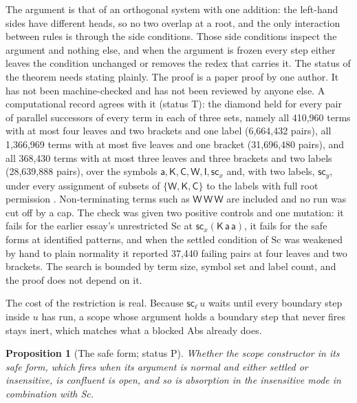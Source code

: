 \documentclass[11pt]{article}
\newtheorem{proposition}[theorem]{Proposition}
\theoremstyle{definition}
\theoremstyle{remark}
\newcommand{\cI}{\mathsf{I}}
\newcommand{\cC}{\mathsf{C}}
\newcommand{\cK}{\mathsf{K}}
\newcommand{\cW}{\mathsf{W}}
\newcommand{\sca}[1]{\mathsf{sc}_{#1}}
\newcommand{\Tt}{status T}
\newcommand{\Pt}{status P}
\begin{document}
The argument is that of an orthogonal system with one addition: the left-hand sides have different heads, so no two overlap at a root, and the only interaction between rules is through the side conditions. Those side conditions inspect the argument and nothing else, and when the argument is frozen every step either leaves the condition unchanged or removes the redex that carries it. The status of the theorem needs stating plainly. The proof is a paper proof by one author. It has not been machine-checked and has not been reviewed by anyone else. A computational record agrees with it (\Tt): the diamond held for every pair of parallel successors of every term in each of three sets, namely all 410{,}960 terms with at most four leaves and two brackets and one label (6{,}664{,}432 pairs), all 1{,}366{,}969 terms with at most five leaves and one bracket (31{,}696{,}480 pairs), and all 368{,}430 terms with at most three leaves and three brackets and two labels (28{,}639{,}888 pairs), over the symbols $\mathsf a,\cK,\cC,\cW,\cI,\sca x$ and, with two labels, $\sca y$, under every assignment of subsets of $\{\cW,\cK,\cC\}$ to the labels with full root permission \citep{kernel}. Non-terminating terms such as $\cW\,\cW\,\cW$ are included and no run was cut off by a cap. The check was given two positive controls and one mutation: it fails for the earlier essay's unrestricted $\mathrm{Sc}$ at $\sca x(\cK\,\mathsf a\,\mathsf a)$, it fails for the safe forms at identified patterns, and when the settled condition of $\mathrm{Sc}$ was weakened by hand to plain normality it reported 37{,}440 failing pairs at four leaves and two brackets. The search is bounded by term size, symbol set and label count, and the proof does not depend on it.

The cost of the restriction is real. Because $\sca\ell\,u$ waits until every boundary step inside $u$ has run, a scope whose argument holds a boundary step that never fires stays inert, which matches what a blocked Abs already does.

\begin{proposition}[The safe form; \Pt]\label{prop:safe}
Whether the scope constructor in its safe form, which fires when its argument is normal and either settled or insensitive, is confluent is open, and so is absorption in the insensitive mode in combination with Sc.
\end{proposition}
\end{document}
